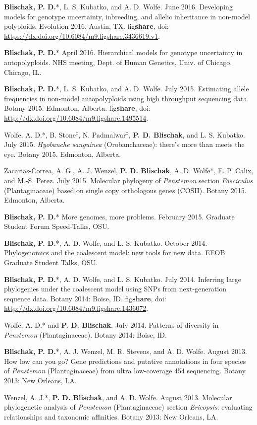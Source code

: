 \documentclass[]{article}
\begin{document}
\begin{etaremune}
\item
  \textbf{Blischak, P. D.}*, L. S. Kubatko, and A. D. Wolfe. June 2016. 
  Developing models for genotype uncertainty, inbreeding, and 
  allelic inheritance in non-model polyploids. Evolution 2016. Austin, TX. 
  fig\textbf{share}, doi: 
  \href{https://dx.doi.org/10.6084/m9.figshare.3436619.v1}{\url{https://dx.doi.org/10.6084/m9.figshare.3436619.v1}}.
\item
  \textbf{Blischak, P. D.}* April 2016. Hierarchical models for genotype
  uncertainty in autopolyploids. NHS meeting, Dept. of Human Genetics, Univ.
  of Chicago. Chicago, IL.
\item
  \textbf{Blischak, P. D.}*, L. S. Kubatko, and A. D. Wolfe. July 2015.
  Estimating allele frequencies in non-model autopolyploids using high
  throughput sequencing data. Botany 2015. Edmonton, Alberta.
  fig\textbf{share}, doi:
  \href{http://dx.doi.org/10.6084/m9.figshare.1495514}{\url{http://dx.doi.org/10.6084/m9.figshare.1495514}}.
\item
  Wolfe, A. D.*, B. Stone\(^{\ddagger}\), N. Padmalwar\(^{\ddagger}\),
  \textbf{P. D. Blischak}, and L. S. Kubatko. July 2015. \emph{Hyobanche
  sanguinea} (Orobanchaceae): there's more than meets the eye. Botany
  2015. Edmonton, Alberta.
\item
  Zacarias-Correa, A. G., A. J. Wenzel, \textbf{P. D. Blischak}, A. D.
  Wolfe*, E. P. Calix, and M.-S. Perez. July 2015. Molecular phylogeny of
  \emph{Penstemon} section \emph{Fasciculus} (Plantaginaceae) based on
  single copy orthologous genes (COSII). Botany 2015. Edmonton, Alberta.
\item
  \textbf{Blischak, P. D.}* More genomes, more problems. February 2015.
  Graduate Student Forum Speed-Talks, OSU.
\item
  \textbf{Blischak, P. D.}*, A. D. Wolfe, and L. S. Kubatko. October
  2014. Phylogenomics and the coalescent model: new tools for new data.
  EEOB Graduate Student Talks, OSU.
\item
  \textbf{Blischak, P. D.}*, A. D. Wolfe, and L. S. Kubatko. July 2014.
  Inferring large phylogenies under the coalescent model using SNPs from
  next-generation sequence data. Botany 2014: Boise, ID.
  fig\textbf{share}, doi:
  \href{http://dx.doi.org/10.6084/m9.figshare.1436072}{\url{http://dx.doi.org/10.6084/m9.figshare.1436072}}.
\item
  Wolfe, A. D.* and \textbf{P. D. Blischak}. July 2014. Patterns of
  diversity in \emph{Penstemon} (Plantaginaceae). Botany 2014: Boise,
  ID.
\item
  \textbf{Blischak, P. D.}*, A. J. Wenzel, M. R. Stevens, and A. D.
  Wolfe. August 2013. How low can you go? Gene predictions and putative
  annotations in four species of \emph{Penstemon} (Plantaginaceae) from
  ultra low-coverage 454 sequencing. Botany 2013: New Orleans, LA.
\item
  Wenzel, A. J.*, \textbf{P. D. Blischak}, and A. D. Wolfe. August 2013.
  Molecular phylogenetic analysis of \emph{Penstemon} (Plantaginaceae)
  section \emph{Ericopsis}: evaluating relationships and taxonomic
  affinities. Botany 2013: New Orleans, LA.
\end{etaremune}
\end{document}

